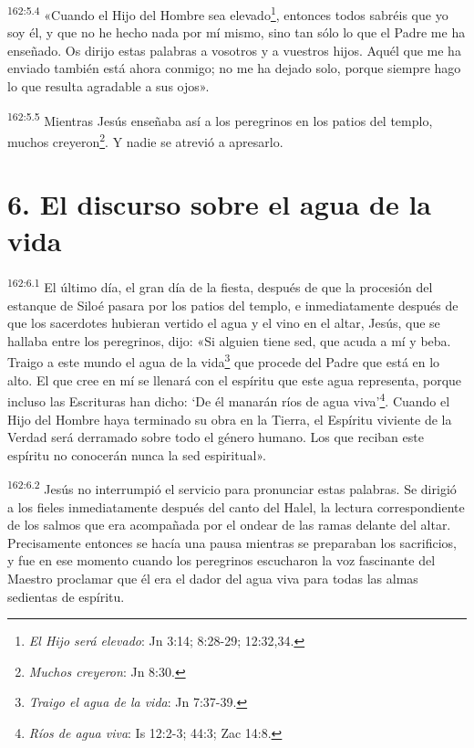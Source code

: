 \par
\textsuperscript{162:5.4} «Cuando el Hijo del Hombre sea elevado\footnote{\textit{El Hijo será elevado}: Jn 3:14; 8:28-29; 12:32,34.}, entonces todos sabréis que yo soy él, y que no he hecho nada por mí mismo, sino tan sólo lo que el Padre me ha enseñado. Os dirijo estas palabras a vosotros y a vuestros hijos. Aquél que me ha enviado también está ahora conmigo; no me ha dejado solo, porque siempre hago lo que resulta agradable a sus ojos».

\par
\textsuperscript{162:5.5} Mientras Jesús enseñaba así a los peregrinos en los patios del templo, muchos creyeron\footnote{\textit{Muchos creyeron}: Jn 8:30.}. Y nadie se atrevió a apresarlo.

\section*{6. El discurso sobre el agua de la vida}
\par
\textsuperscript{162:6.1} El último día, el gran día de la fiesta, después de que la procesión del estanque de Siloé pasara por los patios del templo, e inmediatamente después de que los sacerdotes hubieran vertido el agua y el vino en el altar, Jesús, que se hallaba entre los peregrinos, dijo: «Si alguien tiene sed, que acuda a mí y beba. Traigo a este mundo el agua de la vida\footnote{\textit{Traigo el agua de la vida}: Jn 7:37-39.} que procede del Padre que está en lo alto. El que cree en mí se llenará con el espíritu que este agua representa, porque incluso las Escrituras han dicho: `De él manarán ríos de agua viva'\footnote{\textit{Ríos de agua viva}: Is 12:2-3; 44:3; Zac 14:8.}. Cuando el Hijo del Hombre haya terminado su obra en la Tierra, el Espíritu viviente de la Verdad será derramado sobre todo el género humano. Los que reciban este espíritu no conocerán nunca la sed espiritual».

\par
\textsuperscript{162:6.2} Jesús no interrumpió el servicio para pronunciar estas palabras. Se dirigió a los fieles inmediatamente después del canto del Halel, la lectura correspondiente de los salmos que era acompañada por el ondear de las ramas delante del altar. Precisamente entonces se hacía una pausa mientras se preparaban los sacrificios, y fue en ese momento cuando los peregrinos escucharon la voz fascinante del Maestro proclamar que él era el dador del agua viva para todas las almas sedientas de espíritu.

